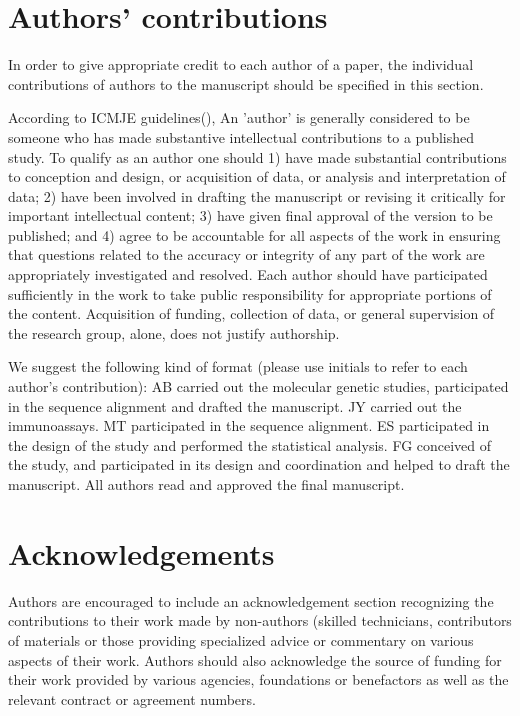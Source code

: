 \documentclass{bmcart}
\begin{document}
\section*{Authors' contributions}
In order to give appropriate credit to each author of a paper, the individual contributions of authors to the manuscript should be specified in this section.

According to ICMJE guidelines(), An 'author' is generally considered to be someone who has made substantive intellectual contributions to a published study. To qualify as an author one should 1) have made substantial contributions to conception and design, or acquisition of data, or analysis and interpretation of data; 2) have been involved in drafting the manuscript or revising it critically for important intellectual content; 3) have given final approval of the version to be published; and 4) agree to be accountable for all aspects of the work in ensuring that questions related to the accuracy or integrity of any part of the work are appropriately investigated and resolved. Each author should have participated sufficiently in the work to take public responsibility for appropriate portions of the content. Acquisition of funding, collection of data, or general supervision of the research group, alone, does not justify authorship.

We suggest the following kind of format (please use initials to refer to each author's contribution): AB carried out the molecular genetic studies, participated in the sequence alignment and drafted the manuscript. JY carried out the immunoassays. MT participated in the sequence alignment. ES participated in the design of the study and performed the statistical analysis. FG conceived of the study, and participated in its design and coordination and helped to draft the manuscript. All authors read and approved the final manuscript.

\section*{Acknowledgements}
Authors are encouraged to include an acknowledgement section recognizing the contributions to their work made by non-authors (skilled technicians, contributors of materials or those providing specialized advice or commentary on various aspects of their work. Authors should also acknowledge the source of funding for their work provided by various agencies, foundations or benefactors as well as the relevant contract or agreement numbers.
\end{document}
